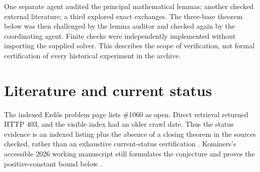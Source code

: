 \documentclass[11pt,a4paper]{article}
\theoremstyle{remark}
\begin{document}
One separate agent audited the principal mathematical lemmas; another checked
external literature; a third explored exact exchanges. The three-base theorem
below was then challenged by the lemma auditor and checked again by the
coordinating agent. Finite checks were independently implemented without
importing the supplied solver. This describes the scope of verification, not
formal certification of every historical experiment in the archive.

\section{Literature and current status}
The indexed Erd\H{o}s problem page lists \#1060 as open. Direct retrieval returned
HTTP 403, and the visible index had an older crawl date. Thus the status evidence
is an indexed listing plus the absence of a closing theorem in the sources
checked, rather than an exhaustive current-status certification
\cite{bloom}. Kominers's accessible 2026 working manuscript still formulates
the conjecture and proves the positive-constant bound below \cite{kominers}.
\end{document}
